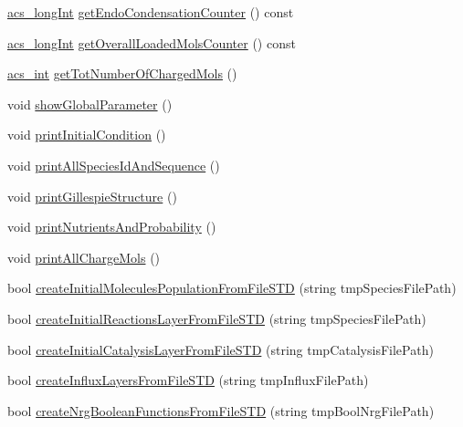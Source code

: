 \begin{DoxyCompactItemize}
\item 
\hyperlink{acs__headers_8h_a19319d75f02db4308bc5c0026d98cd85}{acs\-\_\-long\-Int} \hyperlink{classenvironment_aaa23d550cfa37344dd3bb4d5767e6ea0}{get\-Endo\-Condensation\-Counter} () const 
\item 
\hyperlink{acs__headers_8h_a19319d75f02db4308bc5c0026d98cd85}{acs\-\_\-long\-Int} \hyperlink{classenvironment_a75329459280bc79537a5c08883449a63}{get\-Overall\-Loaded\-Mols\-Counter} () const 
\item 
\hyperlink{acs__headers_8h_a8d277355641a098190360234e2ebde35}{acs\-\_\-int} \hyperlink{classenvironment_aadb5c442d5c9d16a0d6b2e90715dda94}{get\-Tot\-Number\-Of\-Charged\-Mols} ()
\item 
void \hyperlink{classenvironment_af959a6b6a72cb6226fef7f0e7fab5c0c}{show\-Global\-Parameter} ()
\item 
void \hyperlink{classenvironment_a429c2529badaeda72e553f500b990e11}{print\-Initial\-Condition} ()
\item 
void \hyperlink{classenvironment_a48d8fd9d8d5c9c31f0b4af87c8cbd28f}{print\-All\-Species\-Id\-And\-Sequence} ()
\item 
void \hyperlink{classenvironment_aa3a18c59f6127c642603a98c1b3a2224}{print\-Gillespie\-Structure} ()
\item 
void \hyperlink{classenvironment_ad8fcefe5325382fb307627c7e8362ba8}{print\-Nutrients\-And\-Probability} ()
\item 
void \hyperlink{classenvironment_af579052ed051a2e3516218220d238303}{print\-All\-Charge\-Mols} ()
\item 
bool \hyperlink{classenvironment_aee77384e63261db28ef5677844bdbaf6}{create\-Initial\-Molecules\-Population\-From\-File\-S\-T\-D} (string tmp\-Species\-File\-Path)
\item 
bool \hyperlink{classenvironment_a2f181e0d3ad1e8062ba0a8c9358ebc58}{create\-Initial\-Reactions\-Layer\-From\-File\-S\-T\-D} (string tmp\-Species\-File\-Path)
\item 
bool \hyperlink{classenvironment_a29eeb7a1b4689c10fd872e82179b4d84}{create\-Initial\-Catalysis\-Layer\-From\-File\-S\-T\-D} (string tmp\-Catalysis\-File\-Path)
\item 
bool \hyperlink{classenvironment_a902df40829dad9a885122082ec8fff7a}{create\-Influx\-Layers\-From\-File\-S\-T\-D} (string tmp\-Influx\-File\-Path)
\item 
bool \hyperlink{classenvironment_abe1a616460ea328067874df715679319}{create\-Nrg\-Boolean\-Functions\-From\-File\-S\-T\-D} (string tmp\-Bool\-Nrg\-File\-Path)

\end{DoxyCompactItemize}
